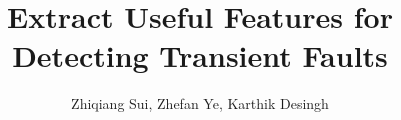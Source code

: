 \documentclass{sig-alternate}
\title{Extract Useful Features for Detecting Transient Faults}
\author{Zhiqiang Sui, Zhefan Ye, Karthik Desingh}
\begin{document}
\maketitle
\thispagestyle{firstpage}
\pagestyle{plain}

\begin{abstract}

\end{abstract}

















\end{document}
